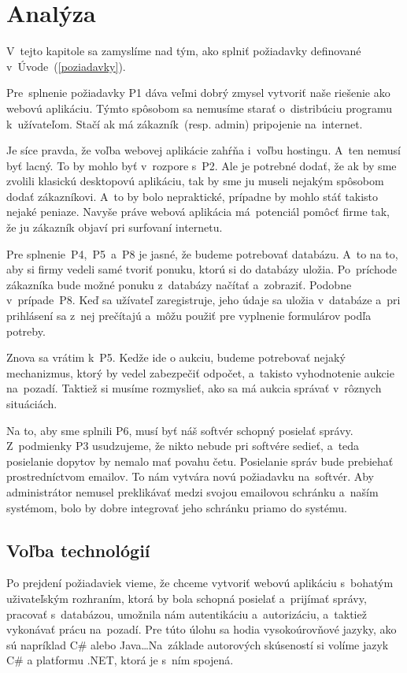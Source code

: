 \chapter{Analýza}

V~tejto kapitole sa zamyslíme nad tým, ako splniť požiadavky definované v~Úvode~(\ref{poziadavky}).

Pre~splnenie požiadavky P1 dáva veľmi dobrý zmysel vytvoriť naše riešenie ako webovú aplikáciu. Týmto spôsobom sa nemusíme starať o~distribúciu programu k~užívateľom. Stačí ak má zákazník~(resp. admin) pripojenie na~internet.

Je síce pravda, že voľba webovej aplikácie zahŕňa i~voľbu hostingu. A~ten nemusí byť lacný. To by mohlo byť v~rozpore s~P2. Ale je potrebné dodať, že ak by sme zvolili klasickú desktopovú aplikáciu, tak by sme ju museli nejakým spôsobom dodať zákazníkovi. A~to by bolo nepraktické, prípadne by mohlo stáť takisto nejaké peniaze. Navyše práve webová aplikácia má~potenciál pomôcť firme tak, že ju zákazník objaví pri surfovaní internetu.

Pre splnenie~P4,~P5~a~P8 je jasné, že budeme potrebovať databázu. A~to na to, aby si firmy vedeli samé tvoriť ponuku, ktorú si do databázy uložia. Po~príchode zákazníka bude možné ponuku z~databázy načítať a~zobraziť. Podobne v~prípade~P8. Keď sa užívateľ zaregistruje, jeho údaje sa uložia v~databáze a~pri prihlásení sa z~nej prečítajú a~môžu použiť pre vyplnenie formulárov podľa potreby.

Znova sa vrátim k~P5. Kedže ide o aukciu, budeme potrebovať nejaký mechanizmus, ktorý by vedel zabezpečiť odpočet, a~takisto vyhodnotenie aukcie na~pozadí. Taktiež si musíme rozmyslieť, ako sa má aukcia správať v~rôznych situáciách.

Na to, aby sme splnili P6, musí byť náš softvér schopný posielať správy. Z~podmienky P3 usudzujeme, že nikto nebude pri softvére sedieť, a~teda posielanie dopytov by nemalo mať povahu četu. Posielanie správ bude prebiehať prostredníctvom emailov. To nám vytvára novú požiadavku na~softvér. Aby administrátor nemusel preklikávať medzi svojou emailovou schránku a~naším systémom, bolo by dobre integrovať jeho schránku priamo do systému.

\section{Voľba technológií}

Po prejdení požiadaviek vieme, že chceme vytvoriť webovú aplikáciu s~bohatým uživateľským rozhraním, ktorá by bola schopná posielať a~prijímať správy, pracovať s~databázou, umožnila nám autentikáciu a~autorizáciu, a~taktiež vykonávať prácu na~pozadí. Pre túto úlohu sa hodia vysokoúrovňové jazyky, ako sú napríklad C\# alebo Java\dots Na~základe autorových skúseností si volíme jazyk C\# a platformu .NET, ktorá je s~ním spojená.

